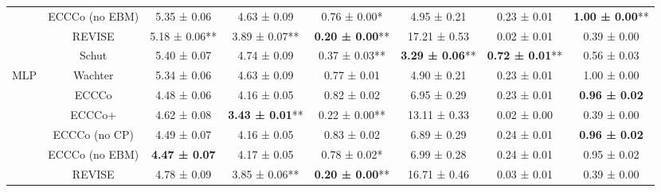 \begin{table}
{\begin{tabular}[t]{cccccccc}
 & ECCCo (no EBM) & 5.35 ± 0.06\hphantom{*}\hphantom{*} & 4.63 ± 0.09\hphantom{*}\hphantom{*} & 0.76 ± 0.00*\hphantom{*} & 4.95 ± 0.21\hphantom{*}\hphantom{*} & 0.23 ± 0.01\hphantom{*}\hphantom{*} & \textbf{1.00 ± 0.00}**\\

 & REVISE & 5.18 ± 0.06** & 3.89 ± 0.07** & \textbf{0.20 ± 0.00}** & 17.21 ± 0.53\hphantom{*}\hphantom{*} & 0.02 ± 0.01\hphantom{*}\hphantom{*} & 0.39 ± 0.00\hphantom{*}\hphantom{*}\\

 & Schut & 5.40 ± 0.07\hphantom{*}\hphantom{*} & 4.74 ± 0.09\hphantom{*}\hphantom{*} & 0.37 ± 0.03** & \textbf{3.29 ± 0.06}** & \textbf{0.72 ± 0.01}** & 0.56 ± 0.03\hphantom{*}\hphantom{*}\\

\multirow[t]{-7}{*}{\centering\arraybackslash MLP} & Wachter & 5.34 ± 0.06\hphantom{*}\hphantom{*} & 4.63 ± 0.09\hphantom{*}\hphantom{*} & 0.77 ± 0.01\hphantom{*}\hphantom{*} & 4.90 ± 0.21\hphantom{*}\hphantom{*} & 0.23 ± 0.01\hphantom{*}\hphantom{*} & 1.00 ± 0.00\hphantom{*}\hphantom{*}\\
\cmidrule{1-8}
 & ECCCo & 4.48 ± 0.06\hphantom{*}\hphantom{*} & 4.16 ± 0.05\hphantom{*}\hphantom{*} & 0.82 ± 0.02\hphantom{*}\hphantom{*} & 6.95 ± 0.29\hphantom{*}\hphantom{*} & 0.23 ± 0.01\hphantom{*}\hphantom{*} & \textbf{0.96 ± 0.02}\hphantom{*}\hphantom{*}\\

 & ECCCo+ & 4.62 ± 0.08\hphantom{*}\hphantom{*} & \textbf{3.43 ± 0.01}** & 0.22 ± 0.00** & 13.11 ± 0.33\hphantom{*}\hphantom{*} & 0.02 ± 0.00\hphantom{*}\hphantom{*} & 0.39 ± 0.00\hphantom{*}\hphantom{*}\\

 & ECCCo (no CP) & 4.49 ± 0.07\hphantom{*}\hphantom{*} & 4.16 ± 0.05\hphantom{*}\hphantom{*} & 0.83 ± 0.02\hphantom{*}\hphantom{*} & 6.89 ± 0.29\hphantom{*}\hphantom{*} & 0.24 ± 0.01\hphantom{*}\hphantom{*} & \textbf{0.96 ± 0.02}\hphantom{*}\hphantom{*}\\

 & ECCCo (no EBM) & \textbf{4.47 ± 0.07}\hphantom{*}\hphantom{*} & 4.17 ± 0.05\hphantom{*}\hphantom{*} & 0.78 ± 0.02*\hphantom{*} & 6.99 ± 0.28\hphantom{*}\hphantom{*} & 0.24 ± 0.01\hphantom{*}\hphantom{*} & 0.95 ± 0.02\hphantom{*}\hphantom{*}\\

 & REVISE & 4.78 ± 0.09\hphantom{*}\hphantom{*} & 3.85 ± 0.06** & \textbf{0.20 ± 0.00}** & 16.71 ± 0.46\hphantom{*}\hphantom{*} & 0.03 ± 0.01\hphantom{*}\hphantom{*} & 0.39 ± 0.00\hphantom{*}\hphantom{*}\\


\end{tabular}}
\end{table}
